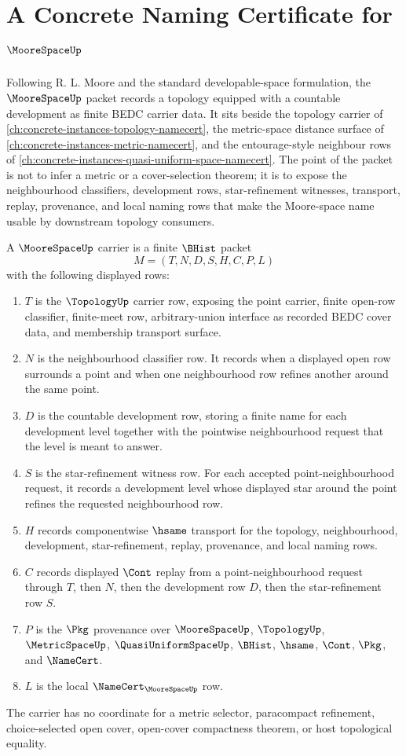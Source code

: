 \chapter{A Concrete Naming Certificate for $\MooreSpaceUp$}
\label{ch:concrete-instances-moore-space-namecert}

Following R. L. Moore and the standard developable-space formulation, the $\MooreSpaceUp$ packet records a topology equipped with a countable development as finite BEDC carrier data. It sits beside the topology carrier of \autoref{ch:concrete-instances-topology-namecert}, the metric-space distance surface of \autoref{ch:concrete-instances-metric-namecert}, and the entourage-style neighbour rows of \autoref{ch:concrete-instances-quasi-uniform-space-namecert}. The point of the packet is not to infer a metric or a cover-selection theorem; it is to expose the neighbourhood classifiers, development rows, star-refinement witnesses, transport, replay, provenance, and local naming rows that make the Moore-space name usable by downstream topology consumers.

\begin{definition}
\label{def:moore-space-carrier}
A $\MooreSpaceUp$ carrier is a finite $\BHist$ packet
$$
M=(T,N,D,S,H,C,P,L)
$$
with the following displayed rows:
\begin{enumerate}
\item $T$ is the $\TopologyUp$ carrier row, exposing the point carrier, finite open-row classifier, finite-meet row, arbitrary-union interface as recorded BEDC cover data, and membership transport surface.
\item $N$ is the neighbourhood classifier row. It records when a displayed open row surrounds a point and when one neighbourhood row refines another around the same point.
\item $D$ is the countable development row, storing a finite name for each development level together with the pointwise neighbourhood request that the level is meant to answer.
\item $S$ is the star-refinement witness row. For each accepted point-neighbourhood request, it records a development level whose displayed star around the point refines the requested neighbourhood row.
\item $H$ records componentwise $\hsame$ transport for the topology, neighbourhood, development, star-refinement, replay, provenance, and local naming rows.
\item $C$ records displayed $\Cont$ replay from a point-neighbourhood request through $T$, then $N$, then the development row $D$, then the star-refinement row $S$.
\item $P$ is the $\Pkg$ provenance over $\MooreSpaceUp$, $\TopologyUp$, $\MetricSpaceUp$, $\QuasiUniformSpaceUp$, $\BHist$, $\hsame$, $\Cont$, $\Pkg$, and $\NameCert$.
\item $L$ is the local $\NameCert_{\MooreSpaceUp}$ row.
\end{enumerate}
The carrier has no coordinate for a metric selector, paracompact refinement, choice-selected open cover, open-cover compactness theorem, or host topological equality.
\end{definition}


